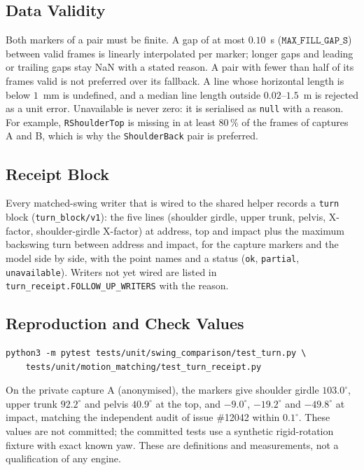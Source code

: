 \documentclass[11pt,a4paper]{article}
\begin{document}
\subsection{Data Validity}
Both markers of a pair must be finite. A gap of at most $0.10$~s ($\texttt{MAX\_FILL\_GAP\_S}$) between valid frames is linearly interpolated per marker; longer gaps and leading or trailing gaps stay NaN with a stated reason. A pair with fewer than half of its frames valid is not preferred over its fallback. A line whose horizontal length is below $1$~mm is undefined, and a median line length outside $0.02$--$1.5$~m is rejected as a unit error. Unavailable is never zero: it is serialised as \texttt{null} with a reason. For example, \texttt{RShoulderTop} is missing in at least $80\,\%$ of the frames of captures A and B, which is why the \texttt{ShoulderBack} pair is preferred.

\subsection{Receipt Block}
Every matched-swing writer that is wired to the shared helper records a \texttt{turn} block (\texttt{turn\_block/v1}): the five lines (shoulder girdle, upper trunk, pelvis, X-factor, shoulder-girdle X-factor) at address, top and impact plus the maximum backswing turn between address and impact, for the capture markers and the model side by side, with the point names and a status (\texttt{ok}, \texttt{partial}, \texttt{unavailable}). Writers not yet wired are listed in \texttt{turn\_receipt.FOLLOW\_UP\_WRITERS} with the reason.

\subsection{Reproduction and Check Values}
\begin{verbatim}
python3 -m pytest tests/unit/swing_comparison/test_turn.py \
    tests/unit/motion_matching/test_turn_receipt.py
\end{verbatim}
On the private capture A (anonymised), the markers give shoulder girdle $103.0^\circ$, upper trunk $92.2^\circ$ and pelvis $40.9^\circ$ at the top, and $-9.0^\circ$, $-19.2^\circ$ and $-49.8^\circ$ at impact, matching the independent audit of issue \#12042 within $0.1^\circ$. These values are not committed; the committed tests use a synthetic rigid-rotation fixture with exact known yaw. These are definitions and measurements, not a qualification of any engine.
\end{document}
